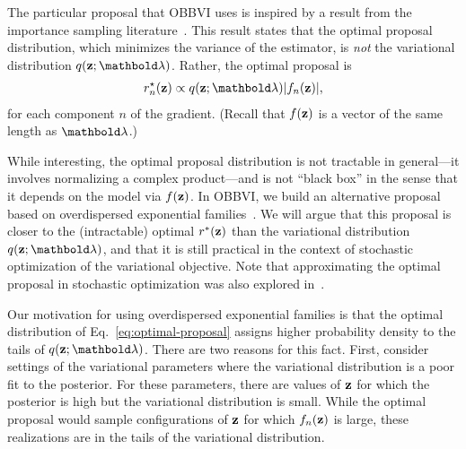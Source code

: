 \documentclass[]{article}
\begin{document}
 The particular proposal that
\gls{OBBVI} uses is inspired by a result from the importance sampling
literature~\citep{Robert2005,Owen2013}. This result
states that the optimal proposal distribution, which minimizes the
variance of the estimator, is \emph{not} the variational distribution
$q(\bz;\blambda)$. Rather, the optimal proposal is
\begin{align}
  \label{eq:optimal-proposal}
  r_n^{\star}(\bz)\propto q(\bz;\blambda) |f_n(\bz)|,
\end{align}
for each component $n$ of the gradient. (Recall that $f(\mathbf{z})$ is a
vector of the same length as $\blambda$.)

%


While interesting, the optimal proposal distribution is not tractable
in general---it involves normalizing a complex product---and is not
``black box'' in the sense that it depends on the model via
$f(\mathbf{z})$. In \gls{OBBVI}, we build an alternative proposal based on
overdispersed exponential families~\citep{Jorgensen1987}.  We will
argue that this proposal is closer to the (intractable) optimal
$r^*(\mathbf{z})$ than the variational distribution $q(\bz;\blambda)$, and
that it is still practical in the context of stochastic optimization
of the variational objective.  Note that approximating the optimal
proposal in stochastic optimization was also explored
in~\citet{Bouchard:2015a}.

 Our motivation for using
overdispersed exponential families is that the optimal distribution of
Eq.~\ref{eq:optimal-proposal} assigns higher probability density to
the tails of $q(\bz;\blambda)$. There are two reasons for this
fact. First, consider settings of the variational parameters where the
variational distribution is a poor fit to the posterior.  For these
parameters, there are values of $\mathbf{z}$ for which the posterior is high
but the variational distribution is small. While the optimal proposal
would sample configurations of $\mathbf{z}$ for which $f_n(\mathbf{z})$ is large,
these realizations are in the tails of the variational distribution.
\end{document}
